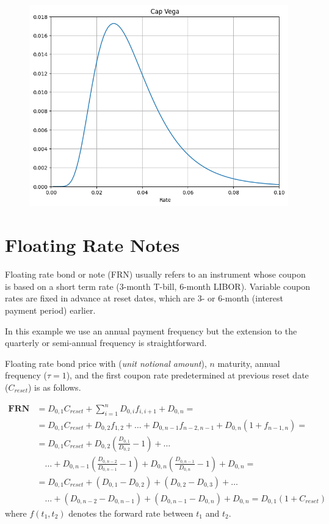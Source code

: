 \documentclass[12pt,a4paper]{article}
\begin{document}
\begin{figure}[htbp]
	\begin{center}
		\includegraphics[width=0.5\linewidth]{addons/cap_vega}
	\end{center}
	\label{fig:cap_vega}
\end{figure}

\clearpage
\section{Floating Rate Notes}
Floating rate bond or note (FRN) usually refers to an instrument whose coupon is based on a short term rate (3-month T-bill, 6-month LIBOR). Variable coupon rates are fixed in advance at reset dates, which are 3- or 6-month (interest payment period) earlier.

In this example we use an annual payment frequency but the extension to the quarterly or semi-annual frequency is straightforward.

Floating rate bond price with (\emph{unit notional amount}), $n$ maturity, annual frequency ($\tau=1$), and the first coupon rate predetermined at previous reset date ($C_{reset}$) is as follows.

\begin{equation}
\begin{aligned}
\textbf{FRN} & = D_{0,1}C_{reset} + \sum_{i=1}^nD_{0,i}f_{i,i+1} + D_{0,n}= \\
& = D_{0,1}C_{reset} + D_{0,2}f_{1,2} + \ldots + D_{0,n-1}f_{n-2,n-1}+ D_{0,n}(1+f_{n-1,n}) = \\
& = D_{0,1}C_{reset} + D_{0,2}\left(\frac{D_{0,1}}{D_{0,2}}-1\right) + \ldots \\
&\quad\ldots + D_{0,n-1}\left(\frac{D_{0,n-2}}{D_{0,n-1}}-1\right) + D_{0,n}\left(\frac{D_{0,n-1}}{D_{0,n}}-1\right) + D_{0,n} = \\
& = D_{0,1}C_{reset} + (D_{0,1} - D_{0,2}) + (D_{0,2} - D_{0,3}) + \ldots \\
&\quad\ldots + (D_{0,n-2} - D_{0,n-1}) + (D_{0,n-1} - D_{0,n}) + D_{0,n} = \boxed{D_{0,1} (1 +C_{reset})}
\end{aligned}
\end{equation}
where $f(t_1,t_2)$ denotes the forward rate between $t_1$ and $t_2$.
\end{document}
